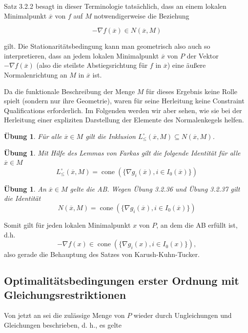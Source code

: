 \documentclass[11pt]{scrreprt}
\newcounter{thm}
\theoremstyle{thmstyle}
\numberwithin{thm}{section}
\newtheorem{uebung}[thm]{Übung}
\begin{document}
Satz 3.2.2 besagt in dieser Terminologie tatsächlich, dass an einem lokalen Minimalpunkt $\overline{x}$ von $f$ auf $M$ notwendigerweise die Beziehung

 $$ - \nabla f(\overline{x}) \in N(\overline{x}, M) $$

gilt. Die Stationaritätsbedingung kann man geometrisch also auch so interpretieren, dass an jedem lokalen Minimalpunkt $\overline{x}$ von $P$ der Vektor $-\nabla f(\overline{x})$ (also die steilste Abstiegsrichtung für $f$ in $\overline{x}$) eine äußere Normalenrichtung an $M$ in $\overline{x}$ ist. ~\bigskip

Da die funktionale Beschreibung der Menge $M$ für dieses Ergebnis keine Rolle spielt (sondern nur ihre Geometrie), waren für seine Herleitung keine Constraint Qualifications erforderlich. Im Folgenden werden wir aber sehen, wie sie bei der Herleitung einer expliziten Darstellung der Elemente des Normalenkegels helfen.

\begin{uebung}
	Für alle $\overline{x} \in M$ gilt die Inklusion $L_{\leq}^\circ(\overline{x}, M) \subseteq N(\overline{x}, M)$.
\end{uebung}

\begin{uebung}
	Mit Hilfe des Lemmas von Farkas gilt die folgende Identität für alle $\overline{x} \in M$
	$$ L_{\leq}^\circ(\overline{x}, M) = \operatorname{cone}(\{ \nabla g_i(\overline{x}), i \in I_0(\overline{x}) \}) $$
\end{uebung}

\begin{uebung}
	An $\overline{x} \in M$ gelte die AB. Wegen Übung 3.2.36 und Übung 3.2.37 gilt die Identität
	$$ N(\overline{x}, M) = \operatorname{cone}(\{ \nabla g_i(\overline{x}), i \in I_0(\overline{x}) \}) $$
\end{uebung}

Somit gilt für jeden lokalen Minimalpunkt $x$ von $P$, an dem die AB erfüllt ist, d.h.
$$ -\nabla f(x) \in \operatorname{cone}(\{ \nabla g_i(x), i \in I_0(x) \}), $$
also gerade die Behauptung des Satzes von Karush-Kuhn-Tucker.

\subsection*{Optimalitätsbedingungen erster Ordnung mit Gleichungsrestriktionen}
 
Von jetzt an sei die zulässige Menge von $P$ wieder durch  Ungleichungen und Gleichungen beschrieben, d. h., es gelte
\end{document}
